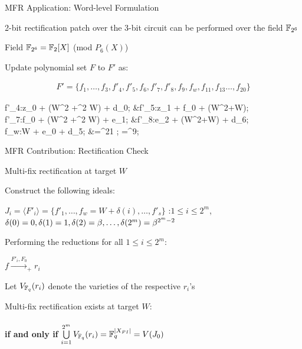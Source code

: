 \begin{frame}{\large MFR Application: Word-level Formulation }
\bi
	\item 2-bit rectification patch over the 3-bit circuit can be performed over the field ${\mathbb{F}}_{2^6}$
	\bi
		\item Field ${\mathbb{F}}_{2^6} = {\mathbb{F}}_2[X]$ (mod $P_6(X)$)
	\ei
	\vspace{0.1in}
	\item Update polynomial set $F$ to $F'$ as:
	\begin{center}
		\begin{align*}
			F'=\{f_1,\dots,f_3,f'_4,f'_5,f_6,f'_7,f'_8,f_9,f_w,f_{11},f_{13}\dots,f_{20}\}
		\end{align*}
		{\small\begin{flalign*}
			f'_4:z_0 + (\be W^2 +\be^2 W) + d_0;     &\quad f'_5:z_1 + f_0 + (W^2+W); \\
			f'_7:f_0 + (\be W^2 +\be^2 W) + e_1;   &\quad f'_8:e_2 + (W^2+W) + d_6; \\
			f_w:W + e_0 + \be d_5;             &\quad \be=\al^{21} ; \ga=\al^9;
		\end{flalign*}}
	\end{center}

\ei
\end{frame}

\begin{frame}{\large MFR Contribution: Rectification Check}
\bi
	\item Multi-fix rectification at target $W$
	\vspace{0.1in}
	\bi
		\item Construct the following ideals:
		\bi
			\item {\small $J_i = \langle F'_i\rangle =\{f'_1,\dots,f_w=W+\delta(i),\dots,f'_s\}$}
				:$1 \leq i \leq 2^m$, $\delta(0)=0, \delta(1)=1,\delta(2)=\beta,\dots,\delta(2^m)= \beta^{2^m-2}$
		\ei
		\vspace{0.1in}
		\item Performing the reductions for all $1 \leq i \leq 2^m$: 
		\bi
			\item $f\xrightarrow{F'_i, F_0}_+r_i $
		\ei
		\item Let $V_{{\mathbb{F}}_{q}}(r_i)$ denote the varieties of the respective $r_i$'s
		\vspace{0.1in}
		\item Multi-fix rectification exists at target $W$: \\ \\ 
				\centering
				{\bf if and only if} $\bigcup\limits_{i=1}^{2^m}V_{{\mathbb{F}}_{q}}(r_i) = {\mathbb{F}}_{q}^{|X_{PI}|} = V(J_0)$
	\ei
\ei
\end{frame}

